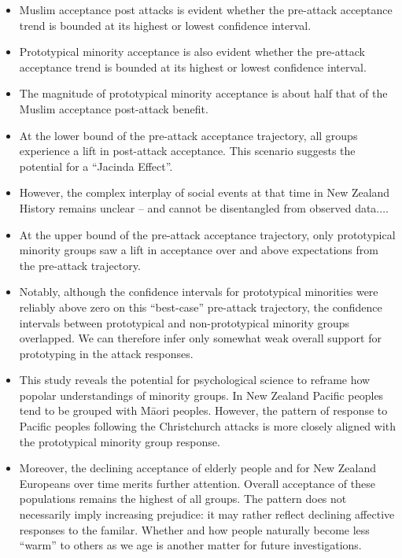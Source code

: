 \documentclass[
  singlecolumn]{report}
\providecommand{\tightlist}{%
  \setlength{\itemsep}{0pt}\setlength{\parskip}{0pt}}\usepackage{longtable,booktabs,array}
\begin{document}
\begin{itemize}
\tightlist
\item
  Muslim acceptance post attacks is evident whether the pre-attack
  acceptance trend is bounded at its highest or lowest confidence
  interval.
\item
  Prototypical minority acceptance is also evident whether the
  pre-attack acceptance trend is bounded at its highest or lowest
  confidence interval.
\item
  The magnitude of prototypical minority acceptance is about half that
  of the Muslim acceptance post-attack benefit.
\item
  At the lower bound of the pre-attack acceptance trajectory, all groups
  experience a lift in post-attack acceptance. This scenario suggests
  the potential for a ``Jacinda Effect''.
\item
  However, the complex interplay of social events at that time in New
  Zealand History remains unclear -- and cannot be disentangled from
  observed data.\(\dots\)
\item
  At the upper bound of the pre-attack acceptance trajectory, only
  prototypical minority groups saw a lift in acceptance over and above
  expectations from the pre-attack trajectory.
\item
  Notably, although the confidence intervals for prototypical minorities
  were reliably above zero on this ``best-case'' pre-attack trajectory,
  the confidence intervals between prototypical and non-prototypical
  minority groups overlapped. We can therefore infer only somewhat weak
  overall support for prototyping in the attack responses.
\item
  This study reveals the potential for psychological science to reframe
  how popolar understandings of minority groups. In New Zealand Pacific
  peoples tend to be grouped with Māori peoples. However, the pattern of
  response to Pacific peoples following the Christchurch attacks is more
  closely aligned with the prototypical minority group response.
\item
  Moreover, the declining acceptance of elderly people and for New
  Zealand Europeans over time merits further attention. Overall
  acceptance of these populations remains the highest of all groups. The
  pattern does not necessarily imply increasing prejudice: it may rather
  reflect declining affective responses to the familar. Whether and how
  people naturally become less ``warm'' to others as we age is another
  matter for future investigations.
\item
  Overall this study reveals both the power and the limitations of
  longitudinal data to address questions of fundamental interest across
  the social sciences.
\item
\end{itemize}
\end{document}
